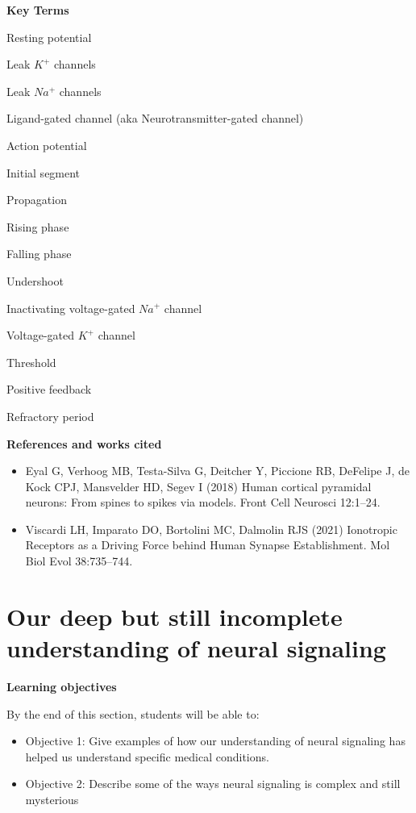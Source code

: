 \documentclass[
]{book}
\begin{document}
\textbf{Key Terms}

Resting potential

Leak \(K^+\) channels

Leak \(Na^+\) channels

Ligand-gated channel (aka Neurotransmitter-gated channel)

Action potential

Initial segment

Propagation

Rising phase

Falling phase

Undershoot

Inactivating voltage-gated \(Na^+\) channel

Voltage-gated \(K^+\) channel

Threshold

Positive feedback

Refractory period

\textbf{References and works cited}

\begin{itemize}
\item
  Eyal G, Verhoog MB, Testa-Silva G, Deitcher Y, Piccione RB, DeFelipe J, de Kock CPJ, Mansvelder HD, Segev I (2018) Human cortical pyramidal neurons: From spines to spikes via models. Front Cell Neurosci 12:1--24.
\item
  Viscardi LH, Imparato DO, Bortolini MC, Dalmolin RJS (2021) Ionotropic Receptors as a Driving Force behind Human Synapse Establishment. Mol Biol Evol 38:735--744.
\end{itemize}

\hypertarget{neurophysiology-wrapup}{%
\section{Our deep but still incomplete understanding of neural signaling}\label{neurophysiology-wrapup}}

\textbf{Learning objectives}

By the end of this section, students will be able to:

\begin{itemize}
\item
  Objective 1: Give examples of how our understanding of neural signaling has helped us understand specific medical conditions.
\item
  Objective 2: Describe some of the ways neural signaling is complex and still mysterious
\end{itemize}
\end{document}
